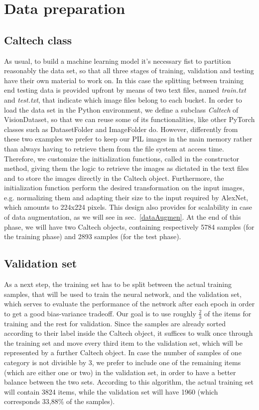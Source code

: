\documentclass[11pt,twoside,a4paper]{article}
\begin{document}
\section{Data preparation}
\subsection{Caltech class}
As usual, to build a machine learning model it's necessary fist to partition reasonably the data set, so that all three stages of training, validation and testing have their own material to work on. In this case the splitting between training end testing data is provided upfront by means of two text files, named \textit{train.txt} and \textit{test.txt}, that indicate which image files belong to each bucket.\newline
In order to load the data set in the Python environment, we define a subclass \textit{Caltech} of VisionDataset, so that we can reuse some of its functionalities, like other PyTorch classes such as DatasetFolder and ImageFolder do. However, differently from these two examples we prefer to keep our PIL images in the main memory rather than always having to retrieve them from the file system at access time.\newline
Therefore, we customize the initialization functions, called in the constructor method, giving them the logic to retrieve the images as dictated in the text files and to store the images directly in the Caltech object. Furthermore, the initialization function perform the desired transformation on the input images, e.g. normalizing them and adapting their size to the input required by AlexNet, which amounts to 224x224 pixels. This design also provides for scalability in case of data augmentation, as we will see in sec.~\ref{dataAugmen}.\newline
At the end of this phase, we will have two Caltech objects, containing respectively 5784 samples (for the training phase) and 2893 samples (for the test phase).

\subsection{Validation set}
As a next step, the training set has to be split between the actual training samples, that will be used to train the neural network, and the validation set, which serves to evaluate the performance of the network after each epoch in order to get a good bias-variance tradeoff. Our goal is to use roughly \( \frac{2}{3} \) of the items for training and the rest for validation.\newline
Since the samples are already sorted according to their label inside the Caltech object, it suffices to walk once through the training set and move every third item to the validation set, which will be represented by a further Caltech object. In case the number of samples of one category is not divisible by 3, we prefer to include one of the remaining items (which are either one or two) in the validation set, in order to have a better balance between the two sets. According to this algorithm, the actual training set will contain 3824 items, while the validation set will have 1960 (which corresponds 33,88\% of the samples).
\end{document}
